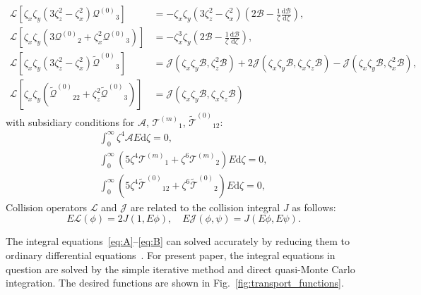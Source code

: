\documentclass[]{jfm}
\newcommand{\dd}{\mathrm{d}}
\newcommand{\der}[2][]{\frac{\dd#1}{\dd#2}}
\newcommand{\Q}{\ensuremath{\mathcal{Q}^{(0)}}}
\newcommand{\T}[1]{\ensuremath{\mathcal{T}^{(#1)}}}
\newcommand{\TT}{\ensuremath{\tilde{\mathcal{T}}^{(0)}}}
\newcommand{\QQ}{\ensuremath{\tilde{\mathcal{Q}}^{(0)}}}
\begin{document}
\begin{align}
    \mathcal{L}\left[ \zeta_x\zeta_y \left( 3\zeta_z^2-\zeta_x^2 \right)\Q_3 \right]
        &= -\zeta_x\zeta_y\left( 3\zeta_z^2-\zeta_x^2 \right)\left(2\mathcal{B} - \frac1\zeta\der[\mathcal{B}]{\zeta}\right), \label{eq:Q3}\\
    \mathcal{L}\left[ \zeta_x\zeta_y \left( 3\Q_2+\zeta_x^2\Q_3 \right) \right]
        &= -\zeta_x^3\zeta_y\left(2\mathcal{B} - \frac1\zeta\der[\mathcal{B}]{\zeta}\right), \label{eq:Q2}\\
    \mathcal{L}\left[ \zeta_x\zeta_y\left( 3\zeta_z^2 - \zeta_x^2 \right)\QQ_3 \right]
        &= \mathcal{J}\left( \zeta_x\zeta_y\mathcal{B}, \zeta_z^2\mathcal{B} \right)
        + 2\mathcal{J}\left( \zeta_x\zeta_y\mathcal{B}, \zeta_x\zeta_z\mathcal{B} \right)
        - \mathcal{J}\left( \zeta_x\zeta_y\mathcal{B}, \zeta_x^2\mathcal{B} \right), \label{eq:QQ3}\\
    \mathcal{L}\left[ \zeta_x\zeta_y \left( \QQ_{22} + \zeta_z^2\QQ_3 \right) \right]
        &= \mathcal{J}\left( \zeta_x\zeta_y\mathcal{B}, \zeta_x\zeta_z\mathcal{B} \right) \label{eq:QQ2}
\end{align}
with subsidiary conditions for \(\mathcal{A}\), \(\T{m}_1\), \(\TT_{12}\):
\begin{gather}
    \int_0^\infty \zeta^4 \mathcal{A} E \dd\zeta = 0, \label{eq:A_constraint}\\
    \int_0^\infty \left( 5\zeta^4\T{m}_1 + \zeta^6\T{m}_2 \right) E \dd\zeta = 0, \label{eq:Tm_constraint}\\
    \int_0^\infty \left( 5\zeta^4\TT_{12} + \zeta^6\TT_2 \right) E \dd\zeta = 0, \label{eq:T12_constraint}
\end{gather}
Collision operators \(\mathcal{L}\) and \(\mathcal{J}\) are related to the collision integral \(J\) as follows:
\begin{equation}\label{eq:mathcalLJ}
    E\mathcal{L}(\phi) = 2J(1, E\phi), \quad E\mathcal{J}(\phi, \psi) = J(E\phi, E\psi).
\end{equation}

The integral equations~\eqref{eq:A}--\eqref{eq:B} can solved accurately
by reducing them to ordinary differential equations~\citep[see e.g.][]{Pekeris1957, Ohwada1992}.
For present paper, the integral equations in question are solved
by the simple iterative method and direct quasi-Monte Carlo integration.
The desired functions are shown in Fig.~\ref{fig:transport_functions}.
\end{document}
